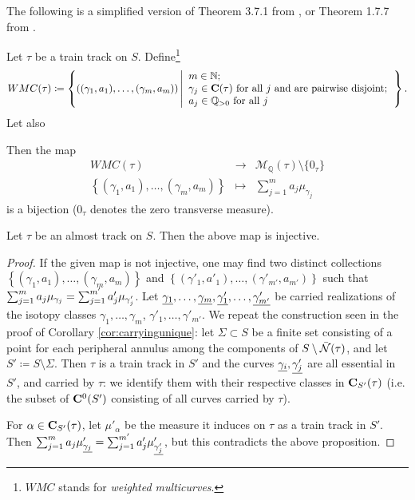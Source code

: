 The following is a simplified version of Theorem 3.7.1 from \cite{mosher}, or Theorem 1.7.7 from \cite{penner}.
\begin{prop}\label{prp:measurecurvecorresp}
Let $\tau$ be a train track on $S$. Define\footnote{$WMC$ stands for \emph{weighted multicurves}.}
$$WMC(\tau)\coloneqq \left\{\left((\gamma_1,a_1),\ldots,(\gamma_m, a_m)\right)\left|\begin{array}{l}
m\in\mathbb N; \\
\gamma_j\in\mathbf C(\tau)\text{ for all } j \text{ and are pairwise disjoint};\\
a_j\in \mathbb Q_{>0}\text{ for all } j
\end{array}\right.\right\}.$$
Let also 

Then the map
\begin{eqnarray*}
WMC(\tau) & \longrightarrow & {\mathcal M}_{\mathbb Q}(\tau)\setminus \{0_\tau\} \\
\left\{(\gamma_1,a_1),\ldots,(\gamma_m, a_m)\right\} & \longmapsto & \sum_{j=1}^m a_j\mu_{\gamma_j}
\end{eqnarray*}
is a bijection ($0_\tau$ denotes the zero transverse measure).
\end{prop}
\begin{coroll}\label{cor:measurecurvecorresp}
Let $\tau$ be an almost track on $S$. Then the above map is injective.
\end{coroll}
\begin{proof}
If the given map is not injective, one may find two distinct collections\linebreak $\left\{(\gamma_1,a_1),\ldots,(\gamma_m, a_m)\right\}$ and $\left\{(\gamma'_1,a'_1),\ldots,(\gamma'_{m'}, a_{m'})\right\}$ such that $\sum_{j=1}^m a_j\mu_{\gamma_j}=\linebreak \sum_{j=1}^{m'} a'_j\mu_{\gamma'_j}$. Let $\underline{\gamma_1},\ldots,\underline{\gamma_m},\underline{\gamma'_1},\ldots,\underline{\gamma'_{m'}}$ be carried realizations of the isotopy classes $\gamma_1,\ldots,\gamma_m$, $\gamma'_1,\ldots,\gamma'_{m'}$. We repeat the construction seen in the proof of Corollary \ref{cor:carryingunique}: let $\Sigma\subset S$ be a finite set consisting of a point for each peripheral annulus among the components of $S\setminus\bar{{\mathcal N}}(\tau)$, and let $S'\coloneqq S\setminus \Sigma$. Then $\tau$ is a train track in $S'$ and the curves $\underline{\gamma_i},\underline{\gamma'_j}$ are all essential in $S'$, and carried by $\tau$: we identify them with their respective classes in $\mathbf C_{S'}(\tau)$ (i.e. the subset of $\mathbf C^0(S')$ consisting of all curves carried by $\tau$).

For $\alpha\in \mathbf C_{S'}(\tau)$, let $\mu'_\alpha$ be the measure it induces on $\tau$ as a train track in $S'$. Then $\sum_{j=1}^m a_j\mu'_{\underline{\gamma_j}}=\sum_{j=1}^{m'} a'_j\mu'_{\underline{\gamma'_j}}$, but this contradicts the above proposition.
\end{proof}

